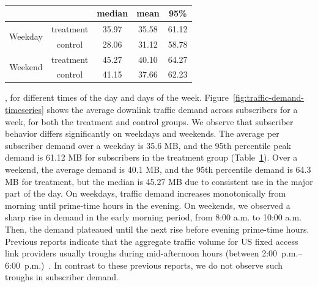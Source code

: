 \begin{table}[t]
\centering
\begin{tabular}{c c | c c c |}
\cline{3-5}
        &           & median & mean  & 95\%  \\ \hline
\multicolumn{1}{|c|}{\multirow{2}{*}{Weekday}} 	& treatment & 35.97  & 35.58 & 61.12 \\
\multicolumn{1}{|c|}{}					        & control   & 28.06  & 31.12 & 58.78 \\\hline
\multicolumn{1}{|c|}{\multirow{2}{*}{Weekend}}	& treatment & 45.27  & 40.10 & 64.27 \\
\multicolumn{1}{|c|}{} 					        & control   & 41.15  & 37.66 & 62.23 \\\hline
\end{tabular}
\caption{}
\label{tab:traffic-demand-description}
\end{table}

, for different times of the day
and days of the week.  Figure~\ref{fig:traffic-demand-timeseries} shows
the average downlink traffic demand across subscribers for a week, for
both the treatment and control groups. We observe that subscriber
behavior differs significantly on weekdays and weekends.  The average
per subscriber demand over a weekday is 35.6 MB, and the 95th percentile
peak demand is 61.12 MB for subscribers in the treatment group
(Table~\ref{tab:traffic-demand-description}).  Over a weekend, the
average demand is 40.1 MB, and the 95th percentile demand is 64.3 MB for
treatment, but the median is 45.27 MB due to consistent use in the major
part of the day.  On weekdays, traffic demand increases monotonically
from morning until prime-time hours in the evening. On weekends, we
observed a sharp rise in demand in the early morning period, from 8:00
a.m. to 10:00 a.m. Then, the demand plateaued until the next rise
before evening prime-time hours. Previous reports indicate that
the aggregate traffic volume for US fixed access link providers usually
troughs during mid-afternoon hours (between
2:00~p.m.--6:00~p.m.)~\cite{sandvine20141h}. In contrast to these
  previous reports, we do not observe such troughs in 
subscriber demand.

